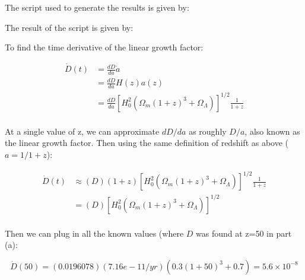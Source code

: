 The script used to generate the results is given by:




The result of the script is given by:




To find the time derivative of the linear growth factor:

\begin{align}
  \dot{D}(t) &= \frac{dD}{da}\dot{a} \\
             &= \frac{dD}{da}H(z)a(z)\\
             &= \frac{dD}{da}\left[H_0^2(\Omega_m(1+z)^3+\Omega_\Lambda)\right]^{1/2}\frac{1}{1+z}\\
\end{align}

At a single value of z, we can approximate $dD/da$ as roughly $D/a$, also known as the linear growth factor. Then using the same definition of redshift as above ($a=1/1+z$):

\begin{align}
  \dot{D}(t) &\approx (D)(1+z)\left[H_0^2(\Omega_m(1+z)^3+\Omega_\Lambda)\right]^{1/2}\frac{1}{1+z}\\
             &=(D)\left[H_0^2(\Omega_m(1+z)^3+\Omega_\Lambda)\right]^{1/2}\\
\end{align}

Then we can plug in all the known values (where $D$ was found at z=50 in part (a):



\begin{equation}
  \dot{D}(50) = (0.0196078)(7.16e-11/yr)(0.3(1+50)^3+0.7) = 5.6 \times 10^{-8}
\end{equation}

